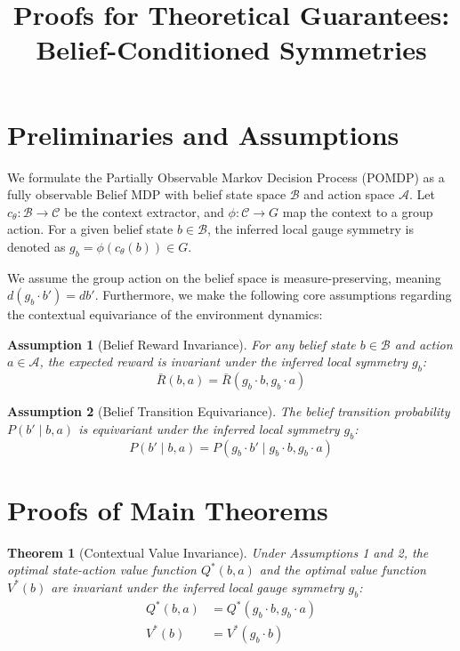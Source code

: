 \documentclass[12pt]{article}
\title{Proofs for Theoretical Guarantees: \\ Belief-Conditioned Symmetries}
\author{}
\date{}
\newtheorem{theorem}{Theorem}
\newtheorem{assumption}{Assumption}
\begin{document}
\maketitle

\section*{Preliminaries and Assumptions}

We formulate the Partially Observable Markov Decision Process (POMDP) as a fully observable Belief MDP with belief state space $\mathcal{B}$ and action space $\mathcal{A}$. Let $c_\theta: \mathcal{B} \rightarrow \mathcal{C}$ be the context extractor, and $\phi: \mathcal{C} \rightarrow G$ map the context to a group action. For a given belief state $b \in \mathcal{B}$, the inferred local gauge symmetry is denoted as $g_b = \phi(c_\theta(b)) \in G$.

We assume the group action on the belief space is measure-preserving, meaning $d(g_b \cdot b') = db'$. Furthermore, we make the following core assumptions regarding the contextual equivariance of the environment dynamics:

\begin{assumption}[Belief Reward Invariance]
For any belief state $b \in \mathcal{B}$ and action $a \in \mathcal{A}$, the expected reward is invariant under the inferred local symmetry $g_b$:
\begin{equation}
    \bar{R}(b, a) = \bar{R}(g_b \cdot b, g_b \cdot a)
\end{equation}
\end{assumption}

\begin{assumption}[Belief Transition Equivariance]
The belief transition probability $P(b' \mid b, a)$ is equivariant under the inferred local symmetry $g_b$:
\begin{equation}
    P(b' \mid b, a) = P(g_b \cdot b' \mid g_b \cdot b, g_b \cdot a)
\end{equation}
\end{assumption}

\section*{Proofs of Main Theorems}

\begin{theorem}[Contextual Value Invariance]
Under Assumptions 1 and 2, the optimal state-action value function $Q^*(b, a)$ and the optimal value function $V^*(b)$ are invariant under the inferred local gauge symmetry $g_b$:
\begin{align}
    Q^*(b, a) &= Q^*(g_b \cdot b, g_b \cdot a) \\
    V^*(b) &= V^*(g_b \cdot b)
\end{align}
\end{theorem}
\end{document}

